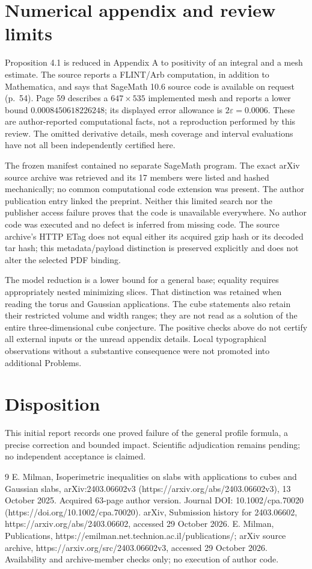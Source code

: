 \documentclass[10pt]{article}
\begin{document}
\section*{Numerical appendix and review limits}
Proposition 4.1 is reduced in Appendix A to positivity of an integral and a mesh estimate. The source reports a FLINT/Arb computation, in addition to Mathematica, and says that SageMath 10.6 source code is available on request (p. 54). Page 59 describes a \(647\times535\) implemented mesh and reports a lower bound \(0.0008450618226248\); its displayed error allowance is \(2\varepsilon=0.0006\). These are author-reported computational facts, not a reproduction performed by this review. The omitted derivative details, mesh coverage and interval evaluations have not all been independently certified here.\par
The frozen manifest contained no separate SageMath program. The exact arXiv source archive was retrieved and its 17 members were listed and hashed mechanically; no common computational code extension was present. The author publication entry linked the preprint. Neither this limited search nor the publisher access failure proves that the code is unavailable everywhere. No author code was executed and no defect is inferred from missing code. The source archive’s HTTP ETag does not equal either its acquired gzip hash or its decoded tar hash; this metadata/payload distinction is preserved explicitly and does not alter the selected PDF binding.\par
The model reduction is a lower bound for a general base; equality requires appropriately nested minimizing slices. That distinction was retained when reading the torus and Gaussian applications. The cube statements also retain their restricted volume and width ranges; they are not read as a solution of the entire three-dimensional cube conjecture. The positive checks above do not certify all external inputs or the unread appendix details. Local typographical observations without a substantive consequence were not promoted into additional Problems.\par
\section*{Disposition}
This initial report records one proved failure of the general profile formula, a precise correction and bounded impact. Scientific adjudication remains pending; no independent acceptance is claimed.\par
9 E. Milman, Isoperimetric inequalities on slabs with applications to cubes and Gaussian slabs, arXiv:2403.06602v3 (https://arxiv.org/abs/2403.06602v3), 13 October 2025. Acquired 63-page author version. Journal DOI: 10.1002/cpa.70020 (https://doi.org/10.1002/cpa.70020). arXiv, Submission history for 2403.06602, https://arxiv.org/abs/2403.06602, accessed 29 October 2026. E. Milman, Publications, https://emilman.net.technion.ac.il/publications/; arXiv source archive, https://arxiv.org/src/2403.06602v3, accessed 29 October 2026. Availability and archive-member checks only; no execution of author code.\par
\end{document}
